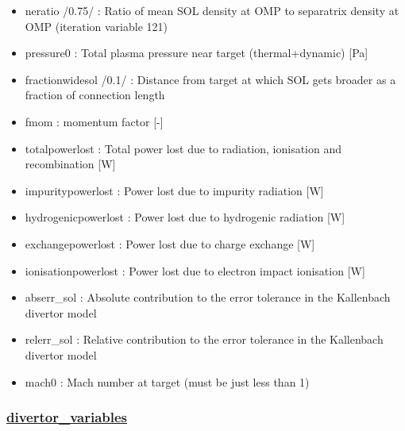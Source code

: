 \documentclass[]{article}
\begin{document}
\begin{itemize}
\begin{itemize}
  \item
    neratio /0.75/ : Ratio of mean SOL density at OMP to separatrix
    density at OMP (iteration variable 121)
  \item
    pressure0 : Total plasma pressure near target (thermal+dynamic)
    {[}Pa{]}
  \item
    fractionwidesol /0.1/ : Distance from target at which SOL gets
    broader as a fraction of connection length
  \item
    fmom : momentum factor {[}-{]}
  \item
    totalpowerlost : Total power lost due to radiation, ionisation and
    recombination {[}W{]}
  \item
    impuritypowerlost : Power lost due to impurity radiation {[}W{]}
  \item
    hydrogenicpowerlost : Power lost due to hydrogenic radiation {[}W{]}
  \item
    exchangepowerlost : Power lost due to charge exchange {[}W{]}
  \item
    ionisationpowerlost : Power lost due to electron impact ionisation
    {[}W{]}
  \item
    abserr\_sol : Absolute contribution to the error tolerance in the
    Kallenbach divertor model
  \item
    relerr\_sol : Relative contribution to the error tolerance in the
    Kallenbach divertor model
  \item
    mach0 : Mach number at target (must be just less than 1)
  \end{itemize}

  \subsubsection{\texorpdfstring{\href{divertor_variables.html}{divertor\_variables}}{divertor\_variables}}\label{divertor_variables}


\end{itemize}
\end{document}
